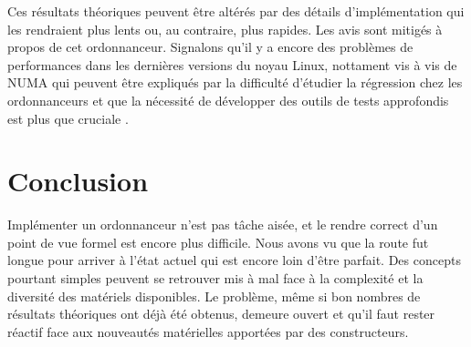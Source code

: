 \documentclass[letterpaper]{article}
\begin{document}
Ces résultats théoriques peuvent être altérés par des détails d'implémentation qui les rendraient plus lents ou, au contraire, plus rapides. Les avis sont mitigés à propos de cet ordonnanceur. Signalons qu'il y a encore des problèmes de performances dans les dernières versions du noyau Linux, nottament vis à vis de NUMA \citep{lozi2016linux, blagodurov2010case} qui peuvent être expliqués par la difficulté d'étudier la régression chez les ordonnanceurs \citep{chen2007keeping} et que la nécessité de développer des outils de tests approfondis est plus que cruciale \citep{erickson2010effective}.

\section{Conclusion}

Implémenter un ordonnanceur n'est pas tâche aisée, et le rendre correct d'un point de vue formel est encore plus difficile. Nous avons vu que la route fut longue pour arriver à l'état actuel qui est encore loin d'être parfait. Des concepts pourtant simples peuvent se retrouver mis à mal face à la complexité et la diversité des matériels disponibles. Le problème, même si bon nombres de résultats théoriques ont déjà été obtenus, demeure ouvert et qu'il faut rester réactif face aux nouveautés matérielles apportées par des constructeurs.

\footnotesize


\end{document}
